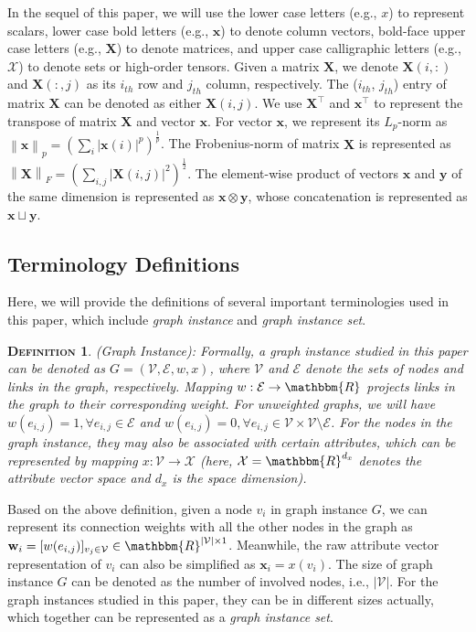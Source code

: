 \documentclass{article}
\newcommand{\mb}{\mathbf}
\newcommand{\mc}{\mathcal}
\newtheorem{definition}{\textsc{Definition}}
\begin{document}
In the sequel of this paper, we will use the lower case letters (e.g., $x$) to represent scalars, lower case bold letters (e.g., $\mb{x}$) to denote column vectors, bold-face upper case letters (e.g., $\mb{X}$) to denote matrices, and upper case calligraphic letters (e.g., $\mathcal{X}$) to denote sets or high-order tensors. Given a matrix $\mb{X}$, we denote $\mb{X}(i,:)$ and $\mb{X}(:,j)$ as its $i_{th}$ row and $j_{th}$ column, respectively. The ($i_{th}$, $j_{th}$) entry of matrix $\mb{X}$ can be denoted as either $\mb{X}(i,j)$. We use $\mb{X}^\top$ and $\mb{x}^\top$ to represent the transpose of matrix $\mb{X}$ and vector $\mb{x}$. For vector $\mb{x}$, we represent its $L_p$-norm as $\left\| \mb{x} \right\|_p = (\sum_i |\mb{x}(i)|^p)^{\frac{1}{p}}$. The Frobenius-norm of matrix $\mb{X}$ is represented as $\left\| \mb{X} \right\|_F = (\sum_{i,j} |\mb{X}(i,j)|^2)^{\frac{1}{2}}$. The element-wise product of vectors $\mb{x}$ and $\mb{y}$ of the same dimension is represented as $\mb{x} \otimes \mb{y}$, whose concatenation is represented as $\mb{x} \sqcup \mb{y}$.

\subsection{Terminology Definitions}

Here, we will provide the definitions of several important terminologies used in this paper, which include \textit{graph instance} and \textit{graph instance set}.

\begin{definition}
(Graph Instance): Formally, a graph instance studied in this paper can be denoted as $G=(\mc{V}, \mc{E}, w, x)$, where $\mc{V}$ and $\mc{E}$ denote the sets of nodes and links in the graph, respectively. Mapping $w: \mc{E} \to \mathbbm{R}$ projects links in the graph to their corresponding weight. For unweighted graphs, we will have $w(e_{i,j}) = 1, \forall e_{i,j} \in \mc{E}$ and $w(e_{i,j}) = 0, \forall e_{i,j} \in \mc{V} \times \mc{V} \setminus \mc{E}$. For the nodes in the graph instance, they may also be associated with certain attributes, which can be represented by mapping $x: \mc{V} \to \mc{X}$ (here, $\mc{X} = \mathbbm{R}^{d_x}$ denotes the attribute vector space and $d_x$ is the space dimension).
\end{definition}

Based on the above definition, given a node $v_i$ in graph instance $G$, we can represent its connection weights with all the other nodes in the graph as $\mb{w}_i = [w(e_{i,j})]_{v_j \in \mc{V}} \in \mathbbm{R}^{|\mc{V}| \times 1}$. Meanwhile, the raw attribute vector representation of $v_i$ can also be simplified as $\mb{x}_i = x(v_i)$. The size of graph instance $G$ can be denoted as the number of involved nodes, i.e., $|\mc{V}|$. For the graph instances studied in this paper, they can be in different sizes actually, which together can be represented as a \textit{graph instance set}.
\end{document}
